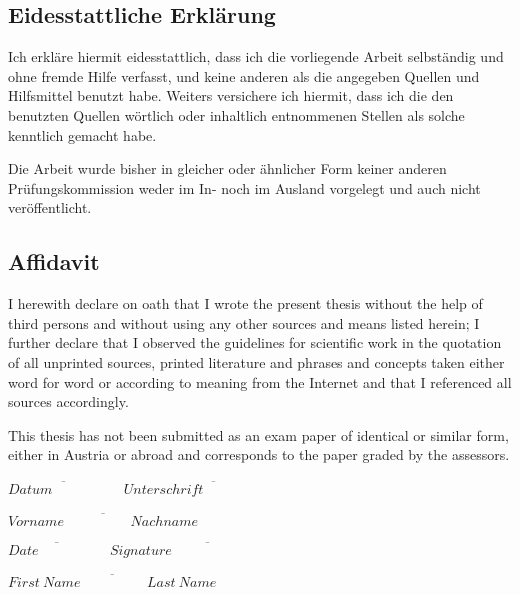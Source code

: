 
\ifmmtlanguagegerman
\subsection*{Eidesstattliche Erklärung}


Ich erkläre hiermit eidesstattlich, dass ich die vorliegende Arbeit selbständig und ohne fremde Hilfe verfasst, und keine anderen als die angegeben Quellen und Hilfsmittel benutzt habe. Weiters versichere ich hiermit, dass ich die den benutzten Quellen wörtlich oder inhaltlich entnommenen Stellen als solche kenntlich gemacht habe.

Die Arbeit wurde bisher in gleicher oder ähnlicher Form keiner anderen Prüfungskommission weder im In- noch im Ausland vorgelegt und auch nicht veröffentlicht.

\else

\subsection*{Affidavit}

I herewith declare on oath that I wrote the present thesis without the help of third persons and without using any other sources and means listed herein; I further declare that I observed the guidelines for scientific work in the quotation of all unprinted sources, printed literature and phrases and concepts taken either word for word or according to meaning from the Internet and that I referenced all sources accordingly.

This thesis has not been submitted as an exam paper of identical or similar form, either in Austria or abroad and corresponds to the paper graded by the assessors.

\fi

\vspace*{3cm}



\hfill

\ifmmtlanguagegerman
$\overline{Datum \hspace{2cm}}$ \hfill $\overline{{Unterschrift}\hspace{3cm}}$

\vspace*{1cm}

\hfill $\overline{{Vorname\hspace{2cm}Nachname}}$
 
 \else
 $\overline{Date \hspace{2cm}}$ \hfill $\overline{{Signature}\hspace{4cm}}$

\vspace*{1cm}

 \hfill $\overline{{First~Name\hspace{2cm}Last~Name}}$
 \fi

